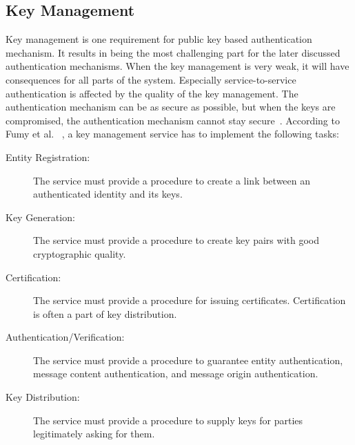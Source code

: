 \subsection{Key Management} \label{sec:key_management}
Key management is one requirement for public key based authentication mechanism.
It results in being the most challenging part for the later discussed authentication mechanisms.
When the key management is very weak, it will have consequences for all parts of the system.
Especially service-to-service authentication is affected by the quality of the key management.
The authentication mechanism can be as secure as possible, but when the keys are compromised, the authentication mechanism cannot stay secure~\cite{dias2020microservices, fumy1993principles}.
According to Fumy et al. ~\cite{fumy1993principles}, a key management service has to implement the following tasks:
\begin{description}
	\item[Entity Registration:] The service must provide a procedure to create a link between an authenticated identity and its keys.
	\item[Key Generation:] The service must provide a procedure to create key pairs with good cryptographic quality.
	\item[Certification:] The service must provide a procedure for issuing certificates. Certification is often a part of key distribution.
	\item[Authentication/Verification:] The service must provide a procedure to guarantee entity authentication, message content authentication, and message origin authentication.
	\item[Key Distribution:] The service must provide a procedure to supply keys for parties legitimately asking for them.
\end{description}

